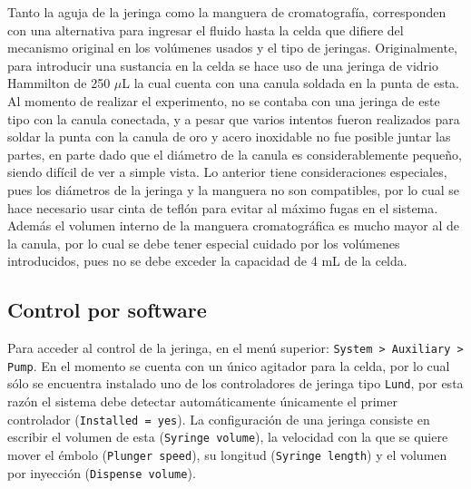 	Tanto la aguja de la jeringa como la manguera de cromatografía, corresponden con una alternativa para ingresar el fluido hasta la celda que difiere del mecanismo original en los volúmenes usados y el tipo de jeringas. Originalmente, para introducir una sustancia en la celda se hace uso de una jeringa de vidrio Hammilton de 250 $\mu$L la cual cuenta con una canula soldada en la punta de esta. Al momento de realizar el experimento, no se contaba con una jeringa de este tipo con la canula conectada, y a pesar que varios intentos fueron realizados para soldar la punta con la canula de oro y acero inoxidable no fue posible juntar las partes, en parte dado que el diámetro de la canula es considerablemente pequeño, siendo difícil de ver a simple vista. Lo anterior tiene consideraciones especiales, pues los diámetros de la jeringa y la manguera no son compatibles, por lo cual se hace necesario usar cinta de teflón para evitar al máximo fugas en el sistema. Además el volumen interno de la manguera cromatogr\'afica es mucho mayor al de la canula, por lo cual se debe tener especial cuidado por los volúmenes introducidos, pues no se debe exceder la capacidad de 4 mL de la celda.
	
	\subsection{Control por software}
	Para acceder al control de la jeringa, en el menú superior: \texttt{System > Auxiliary > Pump}. En el momento se cuenta con un único agitador para la celda, por lo cual sólo se encuentra instalado uno de los controladores de jeringa tipo \texttt{Lund}, por esta razón el sistema debe detectar automáticamente únicamente el primer controlador (\texttt{Installed = yes}). La configuración de una jeringa consiste en escribir el volumen de esta (\texttt{Syringe volume}), la velocidad con la que se quiere mover el émbolo (\texttt{Plunger speed}), su longitud (\texttt{Syringe length}) y el volumen por inyección (\texttt{Dispense volume}).
	
